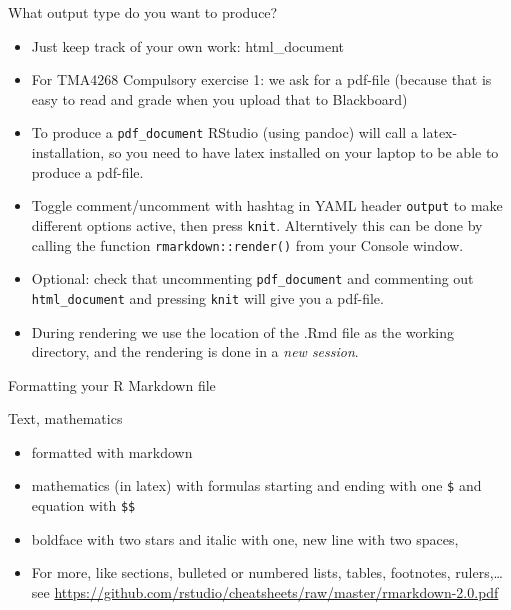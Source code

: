 \documentclass[10pt,ignorenonframetext,]{beamer}
\providecommand{\tightlist}{%
  \setlength{\itemsep}{0pt}\setlength{\parskip}{0pt}}
\begin{document}
\begin{frame}[fragile]

\begin{block}{What output type do you want to produce?}

\vspace{2mm}

\begin{itemize}
\item
  Just keep track of your own work: html\_document
\item
  For TMA4268 Compulsory exercise 1: we ask for a pdf-file (because that
  is easy to read and grade when you upload that to Blackboard)
\item
  To produce a \texttt{pdf\_document} RStudio (using pandoc) will call a
  latex-installation, so you need to have latex installed on your laptop
  to be able to produce a pdf-file.
\item
  Toggle comment/uncomment with hashtag in YAML header \texttt{output}
  to make different options active, then press \texttt{knit}.
  Alterntively this can be done by calling the function
  \texttt{rmarkdown::render()} from your Console window.
\item
  Optional: check that uncommenting \texttt{pdf\_document} and
  commenting out \texttt{html\_document} and pressing \texttt{knit} will
  give you a pdf-file.
\item
  During rendering we use the location of the .Rmd file as the working
  directory, and the rendering is done in a \emph{new session}.
\end{itemize}

\end{block}

\end{frame}

\begin{frame}[fragile]{Formatting your R Markdown file}
\protect\hypertarget{formatting-your-r-markdown-file}{}

\begin{block}{Text, mathematics}

\begin{itemize}
\tightlist
\item
  formatted with markdown
\item
  mathematics (in latex) with formulas starting and ending with one
  \texttt{\$} and equation with \texttt{\$\$}
\item
  boldface with two stars and italic with one, new line with two spaces,
\item
  For more, like sections, bulleted or numbered lists, tables,
  footnotes, rulers,\ldots{} see
  \url{https://github.com/rstudio/cheatsheets/raw/master/rmarkdown-2.0.pdf}
\end{itemize}

\end{block}

\end{frame}
\end{document}
